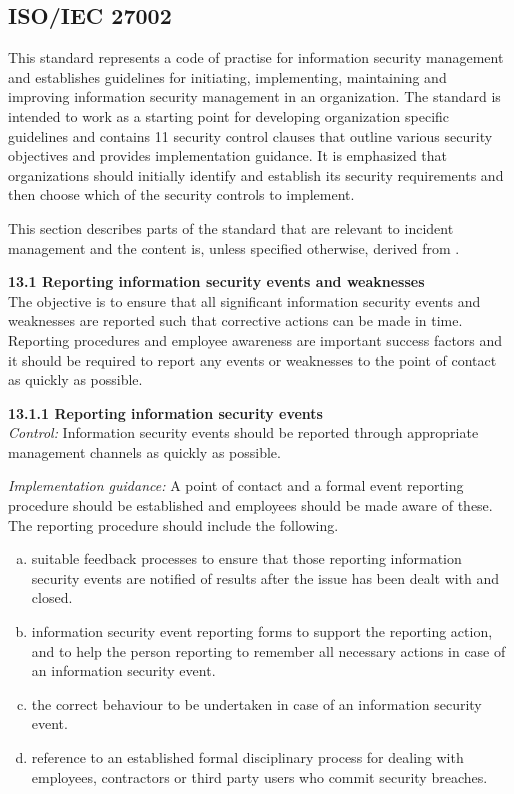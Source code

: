 \subsection{\acs{ISO}/\acs{IEC} 27002}
\label{sec:iso27002}
This standard represents a code of practise for information security management and establishes guidelines for initiating, implementing, maintaining and improving information security management in an organization. The standard is intended to work as a starting point for developing organization specific guidelines and contains 11 security control clauses that outline various security objectives and provides implementation guidance. It is emphasized that organizations should initially identify and establish its security requirements and then choose which of the security controls to implement.

This section describes parts of the standard that are relevant to incident management and the content is, unless specified otherwise, derived from \cite{ISO/IEC27002}.

\textbf{13.1 Reporting information security events and weaknesses } \\
The objective is to ensure that all significant information security events and weaknesses are reported such that corrective actions can be made in time. Reporting procedures and employee awareness are important success factors and it should be required to report any events or weaknesses to the point of contact as quickly as possible.

\textbf{13.1.1 Reporting information security events} \\
\emph{Control:} Information security events should be reported through appropriate management channels as quickly as possible.

\emph{Implementation guidance:} A point of contact and a formal event reporting procedure should be established and employees should be made aware of these. The reporting procedure should include the following.
\begin{enumerate}[a)]
\item suitable feedback processes to ensure that those reporting information security events are notified of results after the issue has been dealt with and closed.
\item information security event reporting forms to support the reporting action, and to help the person reporting to remember all necessary actions in case of an information security event.
\item the correct behaviour to be undertaken in case of an information security event.
\item reference to an established formal disciplinary process for dealing with employees, contractors or third party users who commit security breaches.
\end{enumerate}

